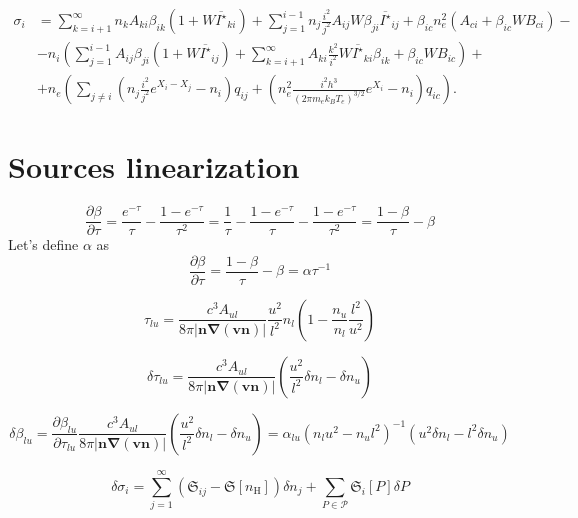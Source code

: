 \documentclass{article}
\begin{document}
\begin{equation}
    \begin{aligned}
        \sigma_i &= \sum\limits_{k=i+1}^\infty n_kA_{ki}\beta_{ik}(1 + W\overline{I^\star}_{ki}) + \sum\limits_{j=1}^{i-1} n_j\frac{i^2}{j^2}A_{ij}W\beta_{ji} \overline{I^\star}_{ij} +\beta_{ic}n_e^2(A_{ci} + \beta_{ic}WB_{ci}) -\\
        &-n_i\left(\sum\limits_{j=1}^{i-1}A_{ij}\beta_{ji}(1 + W\overline{I^\star}_{ij}) + \sum\limits_{k=i+1}^\infty A_{ki}\frac{k^2}{i^2}W\overline{I^\star}_{ki}\beta_{ik}  + \beta_{ic}WB_{ic}\right) +\\
        &+n_e\left(\sum\limits_{j \neq i}\left(n_j\frac{i^2}{j^2}e^{X_i-X_j}-n_i\right)q_{ij}  + \left(n_e^2\frac{i^2h^3}{(2\pi m_ek_BT_e)^{3/2}}e^{X_i}-n_i\right)q_{ic}\right). 
    \end{aligned}
\end{equation}

\section{Sources linearization}

\[
\frac{\partial \beta}{\partial \tau} = \frac{e^{-\tau}}{\tau} - \frac{1-e^{-\tau}}{\tau^2} = \frac{1}{\tau} - \frac{1 - e^{-\tau}}{\tau}  - \frac{1 - e^{-\tau}}{\tau^2} = \frac{1-\beta}{\tau} - \beta
\]
Let's define \(\alpha\) as
\[
\frac{\partial \beta}{\partial \tau} = \frac{1-\beta}{\tau} - \beta = \alpha \tau^{-1}
\]

\[
    \tau_{lu} = \frac{c^3A_{ul}}{8\pi |\mathbf{n}\mathbf{\nabla}(\mathbf{v}\mathbf{n})|}\frac{u^2}{l^2} n_l \left(1 - \frac{n_u}{n_l}\frac{l^2}{u^2}\right)
\]

\[
    \delta\tau_{lu} =  \frac{c^3A_{ul}}{8\pi |\mathbf{n}\mathbf{\nabla}(\mathbf{v}\mathbf{n})|}\left( \frac{u^2}{l^2}\delta n_l - \delta n_u \right)
\]

\[
    \delta\beta_{lu} = \frac{\partial \beta_{lu}}{\partial \tau_{lu}} \frac{c^3A_{ul}}{8\pi |\mathbf{n}\mathbf{\nabla}(\mathbf{v}\mathbf{n})|}\left( \frac{u^2}{l^2}\delta n_l - \delta n_u \right) = \alpha_{lu}(n_lu^2 - n_ul^2)^{-1}(u^2\delta n_l - l^2 \delta n_u)
\]


\[
    \delta\sigma_i = \sum\limits_{j = 1}^\infty  \left(\mathfrak{S}_{ij}-\mathfrak{S}[n_\mathrm{H}]\right)\delta n_j + \sum\limits_{P \in \mathcal{P}}\mathfrak{S}_i[P]\delta{P}
\]
\end{document}
